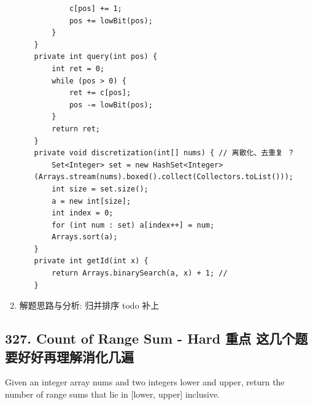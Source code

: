 \documentclass[9pt, b5paaper]{book}
\begin{document}
\begin{enumerate}
\begin{itemize}
\begin{verbatim}
        c[pos] += 1;
        pos += lowBit(pos);
    }
}
private int query(int pos) {
    int ret = 0;
    while (pos > 0) {
        ret += c[pos];
        pos -= lowBit(pos);
    }
    return ret;
}
private void discretization(int[] nums) { // 离散化、去重复 ？
    Set<Integer> set = new HashSet<Integer>(Arrays.stream(nums).boxed().collect(Collectors.toList()));
    int size = set.size();
    a = new int[size];
    int index = 0;
    for (int num : set) a[index++] = num;
    Arrays.sort(a);
}
private int getId(int x) {
    return Arrays.binarySearch(a, x) + 1; // 
}
\end{verbatim}
\end{itemize}
\item 解题思路与分析: 归并排序 todo 补上
\label{sec-1-0-3-3}
\end{enumerate}

\subsection{327. Count of Range Sum - Hard \textbf{重点} 这几个题要好好再理解消化几遍}
\label{sec-1-0-4}
Given an integer array nums and two integers lower and upper, return the number of range sums that lie in [lower, upper] inclusive.
\end{document}
